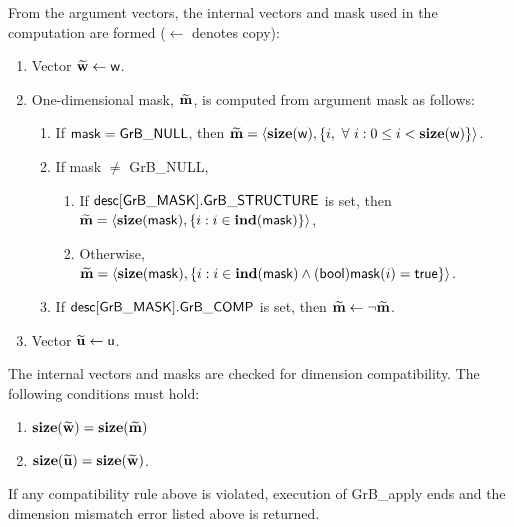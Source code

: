 From the argument vectors, the internal vectors and mask used in 
the computation are formed ($\leftarrow$ denotes copy):
\begin{enumerate}
	\item Vector ${\bf \widetilde{w}} \leftarrow {\sf w}$.

	\item One-dimensional mask, ${\bf \widetilde{m}}$, is computed from 
    argument {\sf mask} as follows:
	\begin{enumerate}
		\item If ${\sf mask} = {\sf GrB\_NULL}$, then ${\bf \widetilde{m}} = 
        \langle \bold{size}({\sf w}), \{i, \ \forall \ i : 0 \leq i < 
        \bold{size}({\sf w}) \} \rangle$.

		\item If {\sf mask} $\ne$ {\sf GrB\_NULL},  
        \begin{enumerate}
            \item If ${\sf desc[GrB\_MASK].GrB\_STRUCTURE}$ is set, then
            ${\bf \widetilde{m}} = 
            \langle \bold{size}({\sf mask}), \{i : i \in \bold{ind}({\sf mask}) \} \rangle$,
            \item Otherwise, ${\bf \widetilde{m}} = 
            \langle \bold{size}({\sf mask}), \{i : i \in \bold{ind}({\sf mask}) \wedge
            ({\sf bool}){\sf mask}(i) = {\sf true} \} \rangle$.
        \end{enumerate}

		\item	If ${\sf desc[GrB\_MASK].GrB\_COMP}$ is set, then 
        ${\bf \widetilde{m}} \leftarrow \neg {\bf \widetilde{m}}$.
	\end{enumerate}

	\item Vector ${\bf \widetilde{u}} \leftarrow {\sf u}$.
\end{enumerate}

The internal vectors and masks are checked for dimension compatibility. 
The following conditions must hold:
\begin{enumerate}
	\item $\bold{size}({\bf \widetilde{w}}) = \bold{size}({\bf \widetilde{m}})$
    \item $\bold{size}({\bf \widetilde{u}}) = \bold{size}({\bf \widetilde{w}})$.
\end{enumerate}
If any compatibility rule above is violated, execution of {\sf GrB\_apply} ends and 
the dimension mismatch error listed above is returned.

